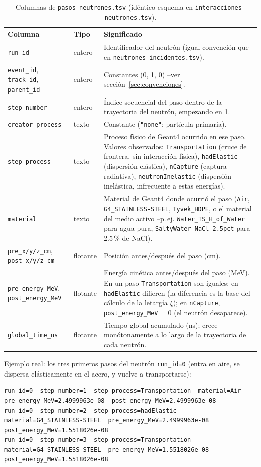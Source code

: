 \documentclass[11pt,a4paper]{article}
\newcommand{\archivo}[1]{\texttt{#1}} %
\newcommand{\var}[1]{\texttt{#1}}
\begin{document}
\begin{table}[H]
\centering
\small
\begin{tabularx}{\linewidth}{l l X}
\toprule
\textbf{Columna} & \textbf{Tipo} & \textbf{Significado} \\
\midrule
\var{run\_id} & entero & Identificador del neutrón (igual convención que en
\archivo{neutrones-incidentes.tsv}). \\
\var{event\_id}, \var{track\_id}, \var{parent\_id} & entero & Constantes (0, 1, 0) --ver
sección~\ref{sec:convenciones}. \\
\var{step\_number} & entero & Índice secuencial del paso dentro de la trayectoria del neutrón,
empezando en 1. \\
\var{creator\_process} & texto & Constante (\var{"none"}: partícula primaria). \\
\var{step\_process} & texto & Proceso físico de Geant4 ocurrido en ese paso. Valores observados:
\var{Transportation} (cruce de frontera, sin interacción física), \var{hadElastic} (dispersión
elástica), \var{nCapture} (captura radiativa), \var{neutronInelastic} (dispersión inelástica,
infrecuente a estas energías). \\
\var{material} & texto & Material de Geant4 donde ocurrió el paso (\var{Air},
\var{G4\_STAINLESS-STEEL}, \var{Tyvek\_HDPE}, o el material del medio activo --p.\,ej.
\var{Water\_TS\_H\_of\_Water} para agua pura, \var{SaltyWater\_NaCl\_2.5pct} para 2.5\,\% de NaCl). \\
\var{pre\_x/y/z\_cm}, \var{post\_x/y/z\_cm} & flotante & Posición antes/después del paso (cm). \\
\var{pre\_energy\_MeV}, \var{post\_energy\_MeV} & flotante & Energía cinética antes/después del
paso (MeV). En un paso \var{Transportation} son iguales; en \var{hadElastic} difieren (la
diferencia es la base del cálculo de la letargía $\xi$); en \var{nCapture},
\var{post\_energy\_MeV} = 0 (el neutrón desaparece). \\
\var{global\_time\_ns} & flotante & Tiempo global acumulado (ns); crece monótonamente a lo largo de
la trayectoria de cada neutrón. \\
\bottomrule
\end{tabularx}
\caption{Columnas de \archivo{pasos-neutrones.tsv} (idéntico esquema en
\archivo{interacciones-neutrones.tsv}).}
\label{tab:esquema-pasos}
\end{table}

\noindent Ejemplo real: los tres primeros pasos del neutrón \var{run\_id=0} (entra en aire, se
dispersa elásticamente en el acero, y vuelve a transportarse):
\begin{lstlisting}
run_id=0  step_number=1  step_process=Transportation  material=Air              pre_energy_MeV=2.4999963e-08  post_energy_MeV=2.4999963e-08
run_id=0  step_number=2  step_process=hadElastic       material=G4_STAINLESS-STEEL  pre_energy_MeV=2.4999963e-08  post_energy_MeV=1.5518026e-08
run_id=0  step_number=3  step_process=Transportation  material=G4_STAINLESS-STEEL  pre_energy_MeV=1.5518026e-08  post_energy_MeV=1.5518026e-08
\end{lstlisting}
\end{document}
